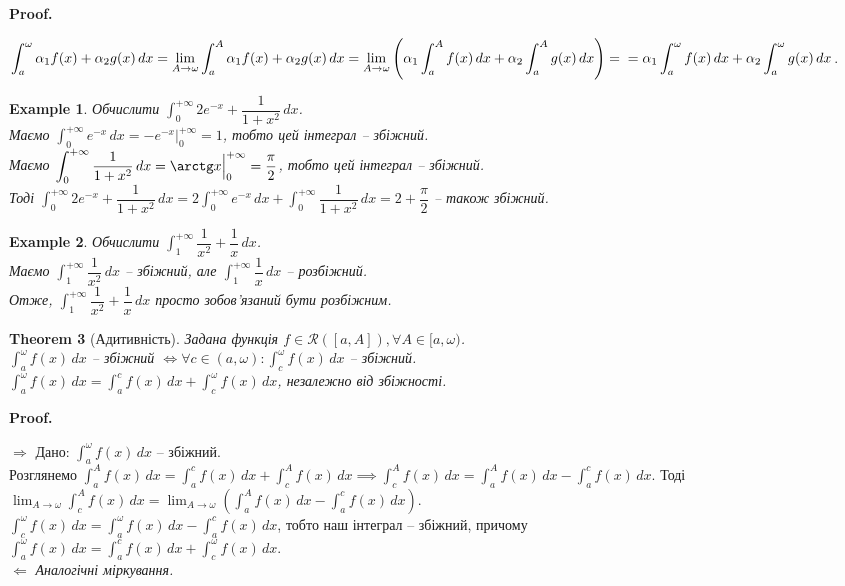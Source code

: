 \documentclass[a4paper, 10pt]{article}
\makeatletter
\def\huge{\displaystyle}
\def\rightproof{$\boxed{\Rightarrow}$ }
\def\leftproof{$\boxed{\Leftarrow}$ }
\theoremstyle{theoremdd}
\newtheorem{theorem}{Theorem}[subsection]
\theoremstyle{theoremdd}
\theoremstyle{theoremdd}
\theoremstyle{theoremdd}
\theoremstyle{theoremdd}
\newtheorem{example}[theorem]{Example}
\theoremstyle{theoremdd}
\theoremstyle{theoremdd}
\theoremstyle{theoremdd}
\theoremstyle{theoremdd}
\renewenvironment{proof}[1][Proof.\\]{\par
\pushQED{\hfill \qed}%
\normalfont \topsep6\p@\@plus6\p@\relax
\trivlist
\item\relax
{\bfseries
#1\@addpunct{.}}\hspace\labelsep\ignorespaces
}{%
\popQED\endtrivlist\@endpefalse
}
\makeatother
\begin{document}
\begin{proof}
$\huge\int_a^\omega \alpha_1 f(x) + \alpha_2 g(x)\,dx = \lim_{A \to \omega} \int_a^A \alpha_1 f(x) + \alpha_2 g(x)\,dx = \lim_{A \to \omega} \left( \alpha_1 \int_a^A f(x)\,dx + \alpha_2 \int_a^A g(x)\,dx \right) = \\ = \alpha_1 \int_a^\omega f(x)\,dx + \alpha_2 \int_a^\omega g(x)\,dx$.
\end{proof}

\begin{example}
Обчислити $\huge\int_0^{+\infty} 2e^{-x} + \dfrac{1}{1+x^2}\,dx$.\\
Маємо $\huge\int_0^{+\infty} e^{-x}\,dx = -e^{-x} \Big|_0^{+\infty} = 1$, тобто цей інтеграл -- збіжний.\\
Маємо $\huge\int_0^{+\infty} \dfrac{1}{1+x^2}\,dx = \arctg x \Big|_0^{+\infty} = \dfrac{\pi}{2}$, тобто цей інтеграл -- збіжний.\\
Тоді $\huge\int_0^{+\infty} 2e^{-x} + \dfrac{1}{1+x^2}\,dx = 2 \int_0^{+\infty} e^{-x}\,dx + \int_0^{+\infty} \dfrac{1}{1+x^2}\,dx = 2 + \dfrac{\pi}{2}$ -- також збіжний.
\end{example}

\begin{example}
Обчислити $\displaystyle\int_1^{+\infty} \dfrac{1}{x^2} + \dfrac{1}{x}\,dx$.\\
Маємо $\displaystyle\int_1^{+\infty} \dfrac{1}{x^2}\,dx$ -- збіжний, але $\displaystyle\int_1^{+\infty} \dfrac{1}{x}\,dx$ -- розбіжний.\\
Отже, $\displaystyle\int_1^{+\infty} \dfrac{1}{x^2} + \dfrac{1}{x}\,dx$ просто зобов'язаний бути розбіжним.
\end{example}

\begin{theorem}[Адитивність]
Задана функція $f \in \mathcal{R}([a,A]), \forall A \in [a,\omega)$.\\
$\huge\int_a^\omega f(x)\,dx$ -- збіжний $\iff \forall c \in (a,\omega): \huge\int_c^\omega f(x)\,dx$ -- збіжний. \\ 
$\huge\int_a^\omega f(x)\,dx = \int_a^c f(x)\,dx + \int_c^\omega f(x)\,dx$, незалежно від збіжності.
\end{theorem}

\begin{proof}
\rightproof Дано: $\huge\int_a^\omega f(x)\,dx$ -- збіжний.\\
Розглянемо $\huge\int_a^A f(x)\,dx = \int_a^c f(x)\,dx + \int_c^A f(x)\,dx \implies \int_c^A f(x)\,dx = \huge\int_a^A f(x)\,dx - \int_a^c f(x)\,dx$.
Тоді $\huge\lim_{A \to \omega} \int_c^A f(x)\,dx = \huge\lim_{A \to \omega} \left( \int_a^A f(x)\,dx - \int_a^c f(x)\,dx \right)$.\\
$\huge\int_c^\omega f(x)\,dx = \int_a^\omega f(x)\,dx - \int_a^c f(x)\,dx$, тобто наш інтеграл -- збіжний, причому\\
$\huge\int_a^\omega f(x)\,dx = \int_a^c f(x)\,dx + \int_c^\omega f(x)\,dx$.
\bigskip \\
\leftproof \textit{Аналогічні міркування.}
\end{proof}
\end{document}
